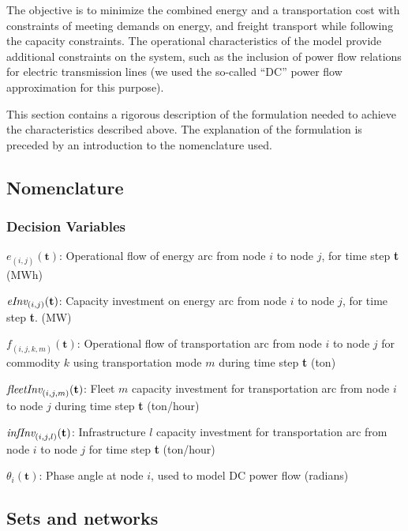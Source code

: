 \documentclass{article}
\begin{document}
The objective is to minimize the combined energy and a transportation cost with constraints of meeting demands on energy, and freight transport while following the capacity constraints. The operational characteristics of the model provide additional constraints on the system, such as the inclusion of power flow relations for electric transmission lines (we used the so-called ``DC'' power flow approximation for this purpose).

This section contains a rigorous description of the formulation needed to achieve the characteristics described above. The explanation of the formulation is preceded by an introduction to the nomenclature used.


\subsection{Nomenclature}

\subsubsection{Decision Variables}

\begin{description}
\item $e_{(i,j)}(\textbf{t})$: Operational flow of energy arc from node $i$ to node $j$, for time step \textbf{t} (MWh)
\item $\emph{eInv}_{(i,j)}(\textbf{t})$: Capacity investment on energy arc from node $i$ to node $j$, for time step \textbf{t}. (MW)
\item $f_{(i,j,k,m)}(\textbf{t})$: Operational flow of transportation arc from node $i$ to node $j$ for commodity $k$ using transportation mode $m$ during time step \textbf{t} (ton)
\item $\emph{fleetInv}_{(i,j,m)}(\textbf{t})$: Fleet $m$ capacity investment for transportation arc from node $i$ to node $j$ during time step \textbf{t} (ton/hour)
\item $\emph{infInv}_{(i,j,l)}(\textbf{t})$: Infrastructure $l$ capacity investment for transportation arc from node $i$ to node $j$ for time step \textbf{t} (ton/hour)
\item $\theta_i(\textbf{t})$: Phase angle at node $i$, used to model DC power flow (radians)
\end{description}


\subsection{Sets and networks}
\end{document}
